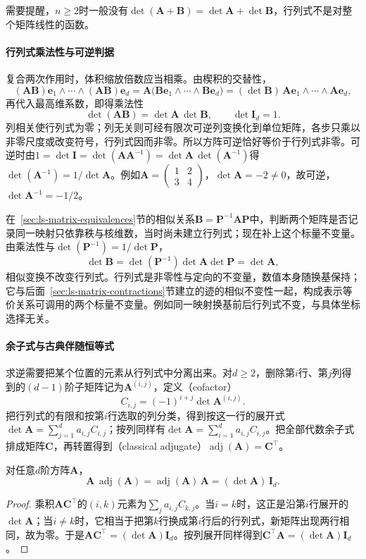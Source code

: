 需要提醒，$n\geq2$时一般没有$\det(\bm A+\bm B)=\det\bm A+\det\bm B$，行列式不是对整个矩阵线性的函数。

\paragraph{行列式乘法性与可逆判据}

复合两次作用时，体积缩放倍数应当相乘。由楔积的交替性，
\[
 (\bm A\bm B)\bm e_1\wedge\cdots\wedge(\bm A\bm B)\bm e_d
 =\bm A\bigl(\bm B\bm e_1\wedge\cdots\wedge\bm B\bm e_d\bigr)
 =(\det\bm B)\,\bm A\bm e_1\wedge\cdots\wedge\bm A\bm e_d,
\]
再代入最高维系数，即得乘法性
\[
 \det(\bm A\bm B)=\det\bm A\,\det\bm B,
 \qquad \det\bm I_d=1.
\]
列相关使行列式为零；列无关则可经有限次可逆列变换化到单位矩阵，各步只乘以非零尺度或改变符号，行列式因而非零。所以方阵可逆恰好等价于行列式非零。可逆时由$1=\det\bm I=\det(\bm A\bm A^{-1})=\det\bm A\,\det(\bm A^{-1})$得$\det(\bm A^{-1})=1/\det\bm A$。例如$\bm A=\begin{pmatrix}1&2\\3&4\end{pmatrix}$，$\det\bm A=-2\neq0$，故可逆，$\det\bm A^{-1}=-1/2$。

在~\ref{sec:ls-matrix-equivalences}节的相似关系$\bm B=\bm P^{-1}\bm A\bm P$中，判断两个矩阵是否记录同一映射只依靠秩与核维数，当时尚未建立行列式；现在补上这个标量不变量。由乘法性与$\det(\bm P^{-1})=1/\det\bm P$，
\[
 \det\bm B
 =\det(\bm P^{-1})\det\bm A\det\bm P
 =\det\bm A,
\]
相似变换不改变行列式。行列式是非零性与定向的不变量，数值本身随换基保持；它与后面~\ref{sec:ls-matrix-contractions}节建立的迹的相似不变性一起，构成表示等价关系可调用的两个标量不变量。例如同一映射换基前后行列式不变，与具体坐标选择无关。

\paragraph{余子式与古典伴随恒等式}

求逆需要把某个位置的元素从行列式中分离出来。对$d\geq2$，删除第$i$行、第$j$列得到的$(d-1)$阶子矩阵记为$\bm A^{(i,j)}$，定义（cofactor）
\[
 C_{i,j}=(-1)^{i+j}\det\bm A^{(i,j)}.
\]
把行列式的有限和按第$i$行选取的列分类，得到按这一行的展开式$\det\bm A=\sum_{j=1}^d a_{i,j}C_{i,j}$；按列同样有$\det\bm A=\sum_{i=1}^d a_{i,j}C_{i,j}$。把全部代数余子式排成矩阵$\bm C$，再转置得到（classical adjugate）$\operatorname{adj}(\bm A)=\bm C^\top$。

\begin{theorem}[古典伴随恒等式]
\label{thm:ls-adjugate-identity}
对任意$d$阶方阵$\bm A$，
\[
 \bm A\,\operatorname{adj}(\bm A)
 =\operatorname{adj}(\bm A)\,\bm A
 =(\det\bm A)\,\bm I_d.
\]
\end{theorem}
\begin{proof}
乘积$\bm A\bm C^\top$的$(i,k)$元素为$\sum_j a_{i,j}C_{k,j}$。当$i=k$时，这正是沿第$i$行展开的$\det\bm A$；当$i\neq k$时，它相当于把第$k$行换成第$i$行后的行列式，新矩阵出现两行相同，故为零。于是$\bm A\bm C^\top=(\det\bm A)\bm I_d$。按列展开同样得到$\bm C^\top\bm A=(\det\bm A)\bm I_d$。
\end{proof}

